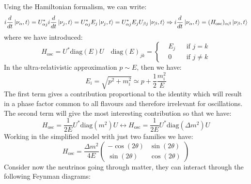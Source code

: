 \documentclass[10.75pt,a4paper,openright,bottom=2cm]{article}
\begin{document}
Using the Hamiltonian formalism, we can write:
\[
i\frac{d}{dt}\ket{\nu_\alpha,t}=U_{\alpha j}^*i\frac{d}{dt}\ket{\nu_j,t}=U_{\alpha j}^*E_j\ket{\nu_j,t}=U_{\alpha j}^*E_jU_{\beta j}\ket{\nu_\beta,t}\Rightarrow i\frac{d}{dt}\ket{\nu_\alpha,t}=(H_{\text{osc}})_{\alpha\beta}\ket{\nu_\beta,t}
\]
where we have introduced:
\[
H_{\text{osc}}=U^*\text{diag}(E)U \quad \text{diag}(E)_{jk}=\left\{\begin{aligned}
&E_j &&\text{if $j=k$}\\
&0 &&\text{if $j\neq k$} 
\end{aligned}
\right.
\]
In the ultra-relativistic approximation $p\sim E$, then we have:
\[
E_i=\sqrt{p^2+m_i^2}\simeq p+\frac{1}{2}\frac{m_i^2}{E}
\]
The first term gives a contribution proportional to the identity which will result in a phase factor common to all flavours and therefore irrelevant for oscillations. The second term will give the most interesting contribution so that we have:
\[
H_{\text{osc}}=\frac{1}{2E}U^*\text{diag}(m^2)U\longleftrightarrow H_{\text{osc}}=\frac{1}{2E}U^*\text{diag}(\Delta m^2)U
\]
Working in the simplified model with just two families we have:
\[
H_{\text{osc}}=\frac{\Delta m^2}{4E}\left(\begin{array}{cc}
    -\cos(2\theta) & \sin(2\theta) \\
    \sin(2\theta) & \cos(2\theta)
\end{array}\right)
\]
Consider now the neutrinos going through matter, they can interact through the following Feynman diagrams:\\
\begin{minipage}{0.5\textwidth}
\begin{center}
\end{center}
\end{minipage}
\end{document}
